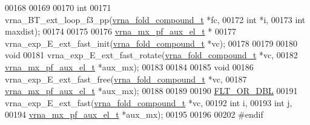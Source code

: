 \begin{DoxyCode}
00168 
00169 
00170 \textcolor{keywordtype}{int}
00171 vrna\_BT\_ext\_loop\_f3\_pp(\hyperlink{group__fold__compound_structvrna__fc__s}{vrna\_fold\_compound\_t} *fc,
00172                        \textcolor{keywordtype}{int}                  *i,
00173                        \textcolor{keywordtype}{int}                  maxdist);
00174 
00175 
00176 \hyperlink{group__loops_structvrna__mx__pf__aux__el__t}{vrna\_mx\_pf\_aux\_el\_t} *
00177 vrna\_exp\_E\_ext\_fast\_init(\hyperlink{group__fold__compound_structvrna__fc__s}{vrna\_fold\_compound\_t} *vc);
00178 
00179 
00180 \textcolor{keywordtype}{void}
00181 vrna\_exp\_E\_ext\_fast\_rotate(\hyperlink{group__fold__compound_structvrna__fc__s}{vrna\_fold\_compound\_t} *vc,
00182                            \hyperlink{group__loops_structvrna__mx__pf__aux__el__t}{vrna\_mx\_pf\_aux\_el\_t}  *aux\_mx);
00183 
00184 
00185 \textcolor{keywordtype}{void}
00186 vrna\_exp\_E\_ext\_fast\_free(\hyperlink{group__fold__compound_structvrna__fc__s}{vrna\_fold\_compound\_t} *vc,
00187                          \hyperlink{group__loops_structvrna__mx__pf__aux__el__t}{vrna\_mx\_pf\_aux\_el\_t}  *aux\_mx);
00188 
00189 
00190 \hyperlink{group__data__structures_ga31125aeace516926bf7f251f759b6126}{FLT\_OR\_DBL}
00191 vrna\_exp\_E\_ext\_fast(\hyperlink{group__fold__compound_structvrna__fc__s}{vrna\_fold\_compound\_t}  *vc,
00192                     \textcolor{keywordtype}{int}                   i,
00193                     \textcolor{keywordtype}{int}                   j,
00194                     \hyperlink{group__loops_structvrna__mx__pf__aux__el__t}{vrna\_mx\_pf\_aux\_el\_t}   *aux\_mx);
00195 
00196 
00202 \textcolor{preprocessor}{#endif}
\end{DoxyCode}
